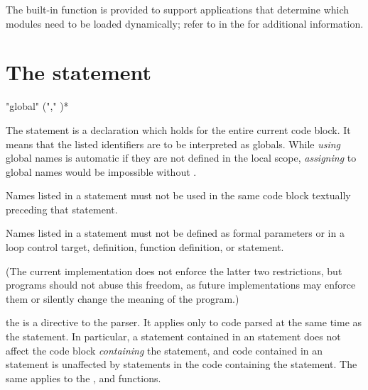 The built-in function  is provided to support
applications that determine which modules need to be loaded
dynamically; refer to  in the
 for additional
information.


\section{The  statement \label{global}}

\begin{productionlist}
             {"global"  ("," )*}
\end{productionlist}

The  statement is a declaration which holds for the
entire current code block.  It means that the listed identifiers are to be
interpreted as globals.  While \emph{using} global names is automatic
if they are not defined in the local scope, \emph{assigning} to global
names would be impossible without .

Names listed in a  statement must not be used in the same
code block textually preceding that  statement.

Names listed in a  statement must not be defined as formal
parameters or in a  loop control target, 
definition, function definition, or  statement.

(The current implementation does not enforce the latter two
restrictions, but programs should not abuse this freedom, as future
implementations may enforce them or silently change the meaning of the
program.)

the  is a directive to the parser.  It
applies only to code parsed at the same time as the 
statement.  In particular, a  statement contained in an
 statement does not affect the code block \emph{containing}
the  statement, and code contained in an 
statement is unaffected by  statements in the code
containing the  statement.  The same applies to the
,  and  functions.


